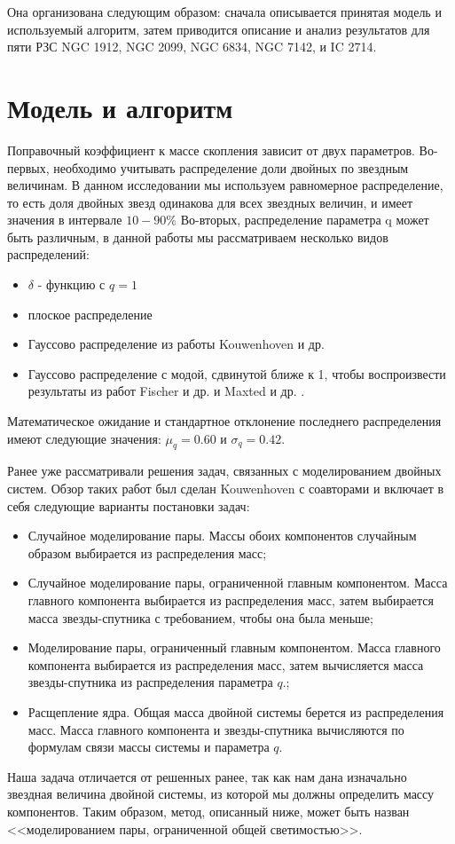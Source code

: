 \documentclass[a4paper,12pt]{article}
\begin{document}
Она организована следующим образом: сначала  описывается принятая модель и используемый алгоритм, затем приводится описание и анализ результатов для пяти РЗС NGC 1912, NGC 2099, NGC 6834, NGC 7142, и IC 2714. 
	
	\section*{Модель и алгоритм}
Поправочный коэффициент к массе скопления зависит от двух параметров. Во-первых, необходимо учитывать распределение доли двойных по звездным величинам. В данном исследовании мы используем равномерное распределение, то есть доля двойных звезд одинакова для всех звездных величин, и имеет значения в интервале $10-90 \%$
Во-вторых, распределение параметра q может быть различным, в данной работы мы рассматриваем несколько видов распределений:
\begin{itemize}
	\item $\delta$ - функцию с $q = 1$
	\item плоское распределение
	\item Гауссово распределение из работы Kouwenhoven и др. \cite{Kouwenhoven}
	\item Гауссово распределение с модой, сдвинутой ближе к 1, чтобы воспроизвести результаты из работ Fischer и др. \cite{Fisher} и Maxted и др. \cite{Maxted}.
\end{itemize}

Математическое ожидание и стандартное отклонение последнего распределения имеют следующие значения: $\mu_q=0.60$ и $\sigma_q=0.42$.

Ранее уже рассматривали решения задач, связанных с моделированием двойных систем. Обзор таких работ был сделан Kouwenhoven \cite{Kouwenhoven} с соавторами и включает в себя следующие варианты постановки задач:

\begin{itemize}
	\item Случайное моделирование пары. Массы обоих компонентов случайным образом выбирается из распределения масс;
	\item Случайное моделирование пары, ограниченной главным компонентом. Масса главного компонента выбирается из распределения масс, затем выбирается масса звезды-спутника с требованием, чтобы она была меньше;
	\item Моделирование пары, ограниченный главным компонентом. Масса главного компонента выбирается из распределения масс, затем вычисляется масса звезды-спутника из распределения параметра $q$.;
	\item Расщепление ядра. Общая масса двойной системы берется из распределения масс. Масса главного компонента и звезды-спутника вычисляются по формулам связи массы системы и параметра $q$.
\end{itemize}
Наша задача отличается от решенных ранее, так как нам дана изначально звездная величина двойной системы, из которой мы должны определить массу компонентов. Таким образом, метод, описанный ниже, может быть назван <<моделированием пары, ограниченной общей светимостью>>.
\end{document}
